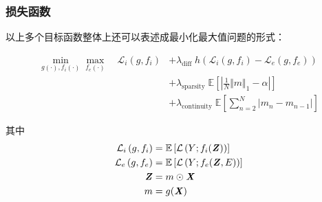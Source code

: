 \subsubsection{损失函数}

以上多个目标函数整体上还可以表述成最小化最大值问题的形式：

\begin{equation}
\begin{aligned}
    \min_{g(\cdot),f_i(\cdot)} \max_{f_e(\cdot)}\quad
    \mathcal{L}_i(g,f_i) &+\lambda_{\text{diff}}\;h(\mathcal{L}_i(g,f_i)-\mathcal{L}_e(g,f_e))
    \\&+\lambda_{\text{sparsity}}\; \mathbb{E} \left[ \left| \frac{1}{N} \Vert m \Vert_1 -\alpha \right| \right]
    \\&+ 
    \lambda_{\text{continuity}}\; \mathbb{E} \left[ \sum_{n=2}^{N} \left| m_n-m_{n-1} \right|
    \right]
\end{aligned}    
\end{equation}

其中
\begin{equation}
\begin{aligned}
    \mathcal{L}_{i}\left(g, f_{i}\right)&=\mathbb{E}\left[\mathcal{L}\left(Y ; f_{i}(\textbf{\textit{Z}})\right)\right]
    \\\mathcal{L}_{e}\left(g, f_{e}\right)&=\mathbb{E}\left[\mathcal{L}\left(Y ; f_{e}(\textbf{\textit{Z}}, E)\right)\right]
    \\\textbf{\textit{Z}} &= m \odot \textbf{\textit{X}}
    \\m &= g(\textbf{\textit{X}})
\end{aligned}
\end{equation}
